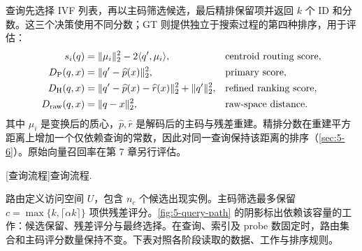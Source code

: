 查询先选择 IVF 列表，再以主码筛选候选，最后精排保留项并返回 $k$ 个 ID 和分数。这三个决策使用不同分数；GT 则提供独立于搜索过程的第四种排序，用于评估：
\begin{align}
 s_i(q)&=\|\mu_i\|_2^2-2\langle q',\mu_i\rangle,
                   &&\text{centroid routing score},\nonumber\\
 D_{\mathrm{P}}(q,x)&=\|q'-\widehat p(x)\|_2^2,
                   &&\text{primary score},\nonumber\\
 D_{\mathrm{H}}(q,x)&=\|q'-\widehat p(x)-\widehat r(x)\|_2^2
                       +\|q'\|_2^2,
                   &&\text{refined ranking score},\nonumber\\
 D_{\mathrm{raw}}(q,x)&=\|q-x\|_2^2,
                   &&\text{raw-space distance}.
 \label{eq:5-ranking-objects}
\end{align}
其中 $\mu_i$ 是变换后的质心，$\widehat p,\widehat r$ 是解码后的主码与残差重建。精排分数在重建平方距离上增加一个仅依赖查询的常数，因此对同一查询保持该距离的排序（\cref{sec:5-6}）。原始向量召回率在第 7 章另行评估。

\par\medskip\noindent\begin{minipage}{\linewidth}
\captionsetup{hypcap=false}
\centering

[查询流程]{查询流程.}
\label{fig:5-query-path}
\end{minipage}\par\medskip
路由定义访问空间 $U$，包含 $n_c$ 个候选出现实例。主码筛选最多保留 $c=\max\{k,\lceil\alpha k\rceil\}$ 项供残差评分。\cref{fig:5-query-path} 的阴影标出依赖该容量的工作：候选保留、残差评分与最终选择。在查询、索引及 probe 数固定时，路由集合和主码评分数量保持不变。下表对照各阶段读取的数据、工作与排序规则。

